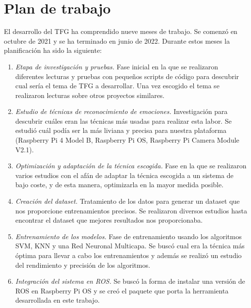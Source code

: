 \section{Plan de trabajo}
\label{sec:plantrabajo}

El desarrollo del TFG ha comprendido nueve meses de trabajo. Se comenzó en octubre de 2021 y se ha terminado en junio de 2022. Durante estos meses la planificación ha sido la siguiente:

\begin{enumerate}
    \item \textit{Etapa de investigación y pruebas.} Fase inicial en la que se realizaron diferentes lecturas y pruebas con pequeños scripts de código para descubrir cual sería el tema de TFG a desarrollar. Una vez escogido el tema se realizaron lecturas sobre otros proyectos similares.
    
    \item \textit{Estudio de técnicas de reconocimiento de emociones.} Investigación para descubrir cuáles eran las técnicas más usadas para realizar esta labor. Se estudió cuál podía ser la más liviana y precisa para nuestra plataforma (Raspberry Pi 4 Model B, Raspberry Pi OS, Raspberry Pi Camera Module V2.1).
    
    \item \textit{Optimización y adaptación de la técnica escogida.} Fase en la que se realizaron varios estudios con el afán de adaptar la técnica escogida a un sistema de bajo coste, y de esta manera, optimizarla en la mayor medida posible.
    
    \item \textit{Creación del dataset.} Tratamiento de los datos para generar un dataset que nos proporcione entrenamientos precisos. Se realizaron diversos estudios hasta encontrar el dataset que mejores resultados nos proporcionaba.
    
    \item \textit{Entrenamiento de los modelos.} Fase de entrenamiento usando los algoritmos SVM, KNN y una Red Neuronal Multicapa. Se buscó cual era la técnica más óptima para llevar a cabo los entrenamientos y además se realizó un estudio del rendimiento y precisión de los algoritmos.
    
    \item \textit{Integración del sistema en ROS.} Se buscó la forma de instalar una versión de ROS en Raspberry Pi OS y se creó el paquete que porta la herramienta desarrollada en este trabajo.
\end{enumerate}
